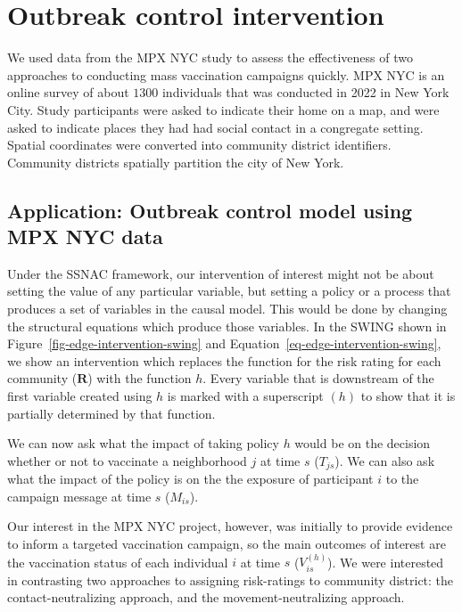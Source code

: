 \documentclass[
  letterpaper,
  DIV=11,
  numbers=noendperiod,
  oneside]{scrreprt}
\begin{document}
\hypertarget{sec-control-intervention}{%
\section{Outbreak control intervention}\label{sec-control-intervention}}

We used data from the MPX NYC study to assess the effectiveness of two
approaches to conducting mass vaccination campaigns quickly. MPX NYC is
an online survey of about \(1300\) individuals that was conducted in
2022 in New York City. Study participants were asked to indicate their
home on a map, and were asked to indicate places they had had social
contact in a congregate setting. Spatial coordinates were converted into
community district identifiers. Community districts spatially partition
the city of New York.

\hypertarget{application-outbreak-control-model-using-mpx-nyc-data}{%
\subsection*{Application: Outbreak control model using MPX NYC
data}\label{application-outbreak-control-model-using-mpx-nyc-data}}

Under the SSNAC framework, our intervention of interest might not be
about setting the value of any particular variable, but setting a policy
or a process that produces a set of variables in the causal model. This
would be done by changing the structural equations which produce those
variables. In the SWING shown in
Figure~\ref{fig-edge-intervention-swing} and
Equation~\ref{eq-edge-intervention-swing}, we show an intervention which
replaces the function for the risk rating for each community
(\(\mathbf{R}\)) with the function \(h\). Every variable that is
downstream of the first variable created using \(h\) is marked with a
superscript \((h)\) to show that it is partially determined by that
function.

We can now ask what the impact of taking policy \(h\) would be on the
decision whether or not to vaccinate a neighborhood \(j\) at time \(s\)
(\(T_{js}\)). We can also ask what the impact of the policy is on the
the exposure of participant \(i\) to the campaign message at time \(s\)
(\(M_{is}\)).

Our interest in the MPX NYC project, however, was initially to provide
evidence to inform a targeted vaccination campaign, so the main outcomes
of interest are the vaccination status of each individual \(i\) at time
\(s\) (\(V^{(h)}_{is}\)). We were interested in contrasting two
approaches to assigning risk-ratings to community district: the
contact-neutralizing approach, and the movement-neutralizing approach.
\end{document}
